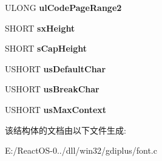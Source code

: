 \begin{DoxyCompactItemize}
\item 
\mbox{\label{struct_t_t___o_s2___v2_ae9278b718351d124dbee27d465c04ecd}} 
U\+L\+O\+NG {\bfseries ul\+Code\+Page\+Range2}
\item 
\mbox{\label{struct_t_t___o_s2___v2_a83e692996fca5a9cd770610bde6bc0c7}} 
S\+H\+O\+RT {\bfseries sx\+Height}
\item 
\mbox{\label{struct_t_t___o_s2___v2_af65b14f39662701d70a16e74adbb3ff9}} 
S\+H\+O\+RT {\bfseries s\+Cap\+Height}
\item 
\mbox{\label{struct_t_t___o_s2___v2_a719e832266025a76cb81ed1ab0e885fd}} 
U\+S\+H\+O\+RT {\bfseries us\+Default\+Char}
\item 
\mbox{\label{struct_t_t___o_s2___v2_aefa4009112046adeffb3cc7d72c36c59}} 
U\+S\+H\+O\+RT {\bfseries us\+Break\+Char}
\item 
\mbox{\label{struct_t_t___o_s2___v2_a17678eb9f67313bae2886d97b84fb4b6}} 
U\+S\+H\+O\+RT {\bfseries us\+Max\+Context}
\end{DoxyCompactItemize}


该结构体的文档由以下文件生成\+:\begin{DoxyCompactItemize}
\item 
E\+:/\+React\+O\+S-\/0../dll/win32/gdiplus/font.\+c\end{DoxyCompactItemize}
